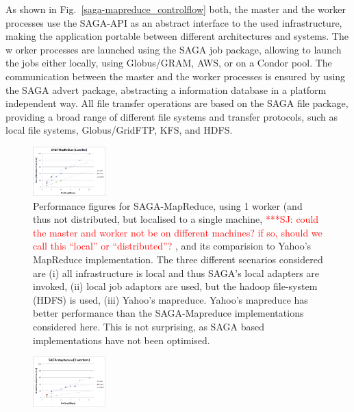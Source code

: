 \documentclass[conference,final]{IEEEtran}
\newcommand{\jhanote}[1]{ {\textcolor{red} { ***SJ: #1 }}}
\newcommand{\jhanote}[1]{}
\begin{document}
As shown in Fig.~\ref{saga-mapreduce_controlflow} both, the master and
the worker processes use the SAGA-API as an abstract interface to the
used infrastructure, making the application portable between different
architectures and systems. The w orker processes are launched using
the SAGA job package, allowing to launch the jobs either locally,
using Globus/GRAM, AWS, or on a Condor pool. The communication between
the master and the worker processes is ensured by using the SAGA
advert package, abstracting a information database in a platform
independent way. All file transfer operations are based on the SAGA
file package, providing a broad range of different file systems and
transfer protocols, such as local file systems, Globus/GridFTP, KFS,
and HDFS.

\begin{figure}[t]
      \centering
          \includegraphics[width=0.25\textwidth]{saga_mapreduce_1worker.png}
          \caption{Performance figures for SAGA-MapReduce, using 1
            worker (and thus not distributed, but localised to a
            single machine, \jhanote{could the master and worker not
              be on different machines? if so, should we call this
              ``local'' or ``distributed''?}, and its comparision to
            Yahoo's MapReduce implementation. The three different
            scenarios considered are (i) all infrastructure is local
            and thus SAGA's local adapters are invoked, (ii) local job
            adaptors are used, but the hadoop file-system (HDFS) is
            used, (iii) Yahoo's mapreduce. Yahoo's mapreduce has
            better performance than the SAGA-Mapreduce implementations
            considered here. This is not surprising, as SAGA based
            implementations have not been optimised.}
      \label{saga_mapreduce_1worker.png}
\end{figure}

\begin{figure}[t]
      \centering
          \includegraphics[width=0.25\textwidth]{saga_mapreduce_3workers.png}
          \caption{}
      \label{saga_mapreduce_3workers.png}
\end{figure}
\end{document}
